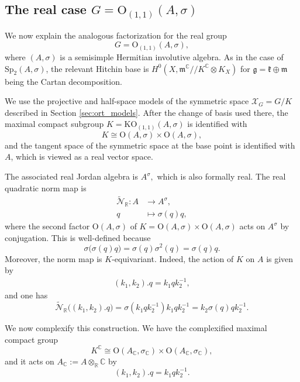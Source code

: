 \documentclass[oneside,11pt]{amsart}
\theoremstyle{definition}
\theoremstyle{remark}
\numberwithin{thm}{section}
\numberwithin{equation}{section}
\begin{document}
\subsection{The real case \texorpdfstring{$G=\mathrm{O}_{(1,1)}(A,\sigma)$}{}}

We now explain the analogous factorization for the real group
\[
G=\mathrm{O}_{(1,1)}(A,\sigma),
\]
where $(A,\sigma)$ is a semisimple Hermitian involutive algebra. As in the case of
$\mathrm{Sp}_2(A,\sigma)$, the relevant Hitchin base is $H^0(X,\mathfrak{m}^{\mathbb{C}}/\!\!/K^{\mathbb{C}}\otimes K_X)$ for $\mathfrak g=\mathfrak k\oplus\mathfrak m$ being the Cartan decomposition.

We use the projective and half-space models of the symmetric space $\mathcal X_G=G/K$ described in Section \ref{sec:ort_models}. After the change of basis used there, the maximal compact subgroup $K=\mathrm{KO}_{(1,1)}(A,\sigma)$ is identified with
\[
K\cong \mathrm{O}(A,\sigma)\times \mathrm{O}(A,\sigma),
\]
and the tangent space of the symmetric space at the base point is identified with $A$, which is viewed as a real vector space.

The associated real Jordan algebra is $A^\sigma,$ which is also formally real. The real quadratic norm map is
\begin{align*}
    \tilde{\mathcal N}_{\mathbb R}:
A &\longrightarrow A^\sigma,\\
q &\longmapsto \sigma(q)q,
\end{align*}
where the second factor $\mathrm{O}(A,\sigma)$ of $K=\mathrm{O}(A,\sigma)\times\mathrm{O}(A,\sigma)$ acts on $A^\sigma$ by conjugation. This is well-defined because
\[
\sigma\bigl(\sigma(q)q\bigr)=\sigma(q)\sigma^2(q)=\sigma(q)q.
\]
Moreover, the norm map is $K$-equivariant. Indeed, the action of $K$ on $A$ is given by
\begin{align}\label{eq:action_on_A_O11}
    (k_1,k_2).q=k_1qk_2^{-1},
\end{align}
and one has
\[
\tilde{\mathcal N}_{\mathbb R}\bigl((k_1,k_2).q\bigr)
=
\sigma(k_1qk_2^{-1})k_1qk_2^{-1}
=
k_2\sigma(q)qk_2^{-1}.
\]

We now complexify this construction. We have the complexified maximal compact group 
\[
K^{\mathbb{C}}\cong\mathrm{O}(A_{\mathbb{C}},\sigma_{\mathbb{C}})\times\mathrm{O}(A_{\mathbb{C}},\sigma_{\mathbb{C}}),
\]
and it acts on $A_{\mathbb{C}}:=A\otimes_{\mathbb R}\mathbb{C}$ by
\[
(k_1,k_2).q=k_1qk_2^{-1}.
\]
\end{document}
